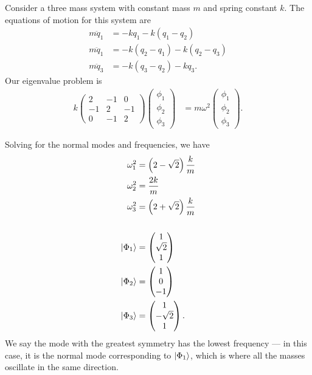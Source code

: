 \documentclass[10pt]{mypackage}
\begin{document}
\begin{example}
  Consider a three mass system with constant mass $m$ and spring constant $k$. The equations of motion for this system are
  \begin{align*}
    m\ddot{q}_1 &= -kq_1 - k\left(q_1 - q_2\right)\\
    m\ddot{q}_1 &= -k\left(q_2 - q_1\right) - k\left(q_2 - q_3\right)\\
    m\ddot{q}_3 &= -k\left(q_3 - q_2\right) - kq_3.
  \end{align*}
  Our eigenvalue problem is 
  \begin{align*}
    k \begin{pmatrix}2 & -1 & 0 \\ -1 & 2 & -1 \\ 0 & -1 & 2\end{pmatrix} \begin{pmatrix}\phi_1\\\phi_2\\\phi_3\end{pmatrix} &= m\omega^2 \begin{pmatrix}\phi_1\\\phi_2\\\phi_3\end{pmatrix}.
  \end{align*}
  
  Solving for the normal modes and frequencies, we have
  \begin{align*}
    \omega_1^2 &= \left(2-\sqrt{2}\right) \frac{k}{m}\\
    \omega_2^2 &= \frac{2k}{m}\\
    \omega_3^2 &= \left(2 + \sqrt{2}\right) \frac{k}{m}\\
    \\
    \ket{\Phi_1} &= \begin{pmatrix}1\\\sqrt{2}\\1\end{pmatrix}\\
    \ket{\Phi_2} &= \begin{pmatrix}1\\0\\-1\end{pmatrix}\\
    \ket{\Phi_3} &= \begin{pmatrix}1\\-\sqrt{2}\\1\end{pmatrix}.
  \end{align*}
  We say the mode with the greatest symmetry has the lowest frequency --- in this case, it is the normal mode corresponding to $\ket{\Phi_1}$, which is where all the masses oscillate in the same direction.
\end{example}
\end{document}
